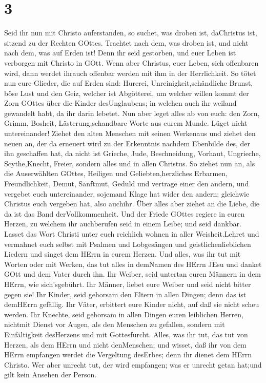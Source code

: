 \hypertarget{section-2}{%
\section{3}\label{section-2}}

 Seid ihr nun mit Christo auferstanden, so suchet, was
droben ist, daChristus ist, sitzend zu der Rechten GOttes. 
Trachtet nach dem, was droben ist, und nicht nach dem, was auf Erden
ist!  Denn ihr seid gestorben, und euer Leben ist verborgen
mit Christo in GOtt.  Wenn aber Christus, euer Leben, sich
offenbaren wird, dann werdet ihrauch offenbar werden mit ihm in der
Herrlichkeit.  So tötet nun eure Glieder, die auf Erden
sind: Hurerei, Unreinigkeit,schändliche Brunst, böse Lust und den Geiz,
welcher ist Abgötterei,  um welcher willen kommt der Zorn
GOttes über die Kinder desUnglaubens;  in welchen auch ihr
weiland gewandelt habt, da ihr darin lebetet.  Nun aber
leget alles ab von euch: den Zorn, Grimm, Bosheit, Lästerung,schandbare
Worte aus eurem Munde.  Lüget nicht untereinander! Ziehet
den alten Menschen mit seinen Werkenaus  und ziehet den
neuen an, der da erneuert wird zu der Erkenntnis nachdem Ebenbilde des,
der ihn geschaffen hat,  da nicht ist Grieche, Jude,
Beschneidung, Vorhaut, Ungrieche, Scythe,Knecht, Freier, sondern alles
und in allen Christus.  So ziehet nun an, als die
Auserwählten GOttes, Heiligen und Geliebten,herzliches Erbarmen,
Freundlichkeit, Demut, Sanftmut, Geduld  und vertrage einer
den andern, und vergebet euch untereinander, sojemand Klage hat wider
den andern; gleichwie Christus euch vergeben hat, also auchihr.
 Über alles aber ziehet an die Liebe, die da ist das Band
derVollkommenheit.  Und der Friede GOttes regiere in euren
Herzen, zu welchem ihr auchberufen seid in einem Leibe; und seid
dankbar.  Lasset das Wort Christi unter euch reichlich
wohnen in aller Weisheit.Lehret und vermahnet euch selbst mit Psalmen
und Lobgesängen und geistlichenlieblichen Liedern und singet dem HErrn
in eurem Herzen.  Und alles, was ihr tut mit Worten oder
mit Werken, das tut alles in demNamen des HErrn JEsu und danket GOtt und
dem Vater durch ihn.  Ihr Weiber, seid untertan euren
Männern in dem HErrn, wie sich'sgebührt.  Ihr Männer,
liebet eure Weiber und seid nicht bitter gegen sie!  Ihr
Kinder, seid gehorsam den Eltern in allen Dingen; denn das ist demHErrn
gefällig.  Ihr Väter, erbittert eure Kinder nicht, auf daß
sie nicht scheu werden.  Ihr Knechte, seid gehorsam in
allen Dingen euren leiblichen Herren, nichtmit Dienst vor Augen, als den
Menschen zu gefallen, sondern mit Einfältigkeit desHerzens und mit
Gottesfurcht.  Alles, was ihr tut, das tut von Herzen, als
dem HErrn und nicht denMenschen;  und wisset, daß ihr von
dem HErrn empfangen werdet die Vergeltung desErbes; denn ihr dienet dem
HErrn Christo.  Wer aber unrecht tut, der wird empfangen;
was er unrecht getan hat;und gilt kein Ansehen der Person.

